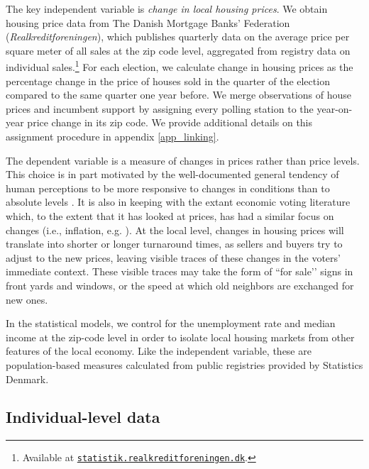 \documentclass[12pt,a4paper]{article}
\begin{document}
	The key independent variable is \textit{change in local housing prices}. We obtain housing price data from The Danish Mortgage Banks' Federation (\textit{Realkreditforeningen}), which publishes quarterly data on the average price per square meter of all sales at the zip code level, aggregated from registry data on individual sales.\footnote{Available at \texttt{\href{http://statistik.realkreditforeningen.dk/}{statistik.realkreditforeningen.dk}}.} For each election, we calculate change in housing prices as the percentage change in the price of houses sold in the quarter of the election compared to the same quarter one year before. We merge observations of house prices and incumbent support by assigning every polling station to the year-on-year price change in its zip code. We provide additional details on this assignment procedure in appendix \ref{app_linking}.
	
	The dependent variable is a measure of changes in prices rather than price levels. This choice is in part motivated by the well-documented general tendency of human perceptions to be more responsive to changes in conditions than to absolute levels \citep{kahneman1979prospect}. It is also in keeping with the extant economic voting literature which, to the extent that it has looked at prices, has had a similar focus on changes (i.e., inflation, e.g. \citep{kramer1971short}). At the local level, changes in housing prices will translate into shorter or longer turnaround times, as sellers and buyers try to adjust to the new prices, leaving visible traces of these changes in the voters’ immediate context. These visible traces may take the form of ``for sale’’ signs in front yards and windows, or the speed at which old neighbors are exchanged for new ones.
	
	In the statistical models, we control for the unemployment rate and median income at the zip-code level in order to isolate local housing markets from other features of the local economy. Like the independent variable, these are population-based measures calculated from public registries provided by Statistics Denmark.
	
	\subsection{Individual-level data}\label{individuallevel}
	
\end{document}
